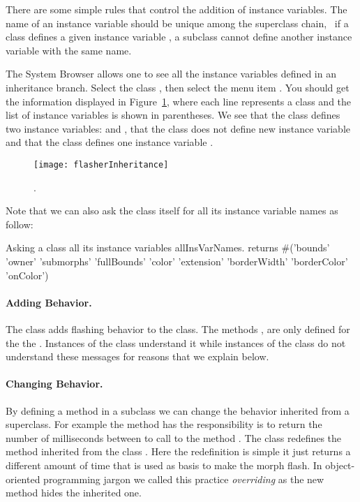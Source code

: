 There are some simple rules that control the addition of instance variables.  The name of an instance variable should be unique among the superclass chain, \ie\ if a class defines a given instance variable , a subclass cannot define another instance variable with the same name. 

The System Browser allows one to see all the instance variables defined in an inheritance branch. Select the class , then select the menu item . You should get the information displayed in Figure~\ref{fig:flasherInheritance}, where each line represents a class and the list of instance variables is shown in parentheses. 
We see that the class  defines two instance variables:  and , that the class  does not define new instance variable and that the class  defines one instance variable .

\begin{figure}[h]
\begin{center}
\texttt{[image: flasherInheritance]}
\caption{.\label{fig:flasherInheritance}}
\end{center}
\end{figure}

Note that we can also ask the class itself for all its instance variable names as follow:

\begin{scriptwithtitle}{Asking a class all its instance variables}
  allInsVarNames.
returns
#('bounds' 'owner' 'submorphs' 'fullBounds' 'color' 'extension' 
'borderWidth' 'borderColor' 'onColor')
\end{scriptwithtitle}


\paragraph{Adding Behavior.} The class  adds flashing behavior to the  class. The methods ,  are only defined for the the . Instances of the class  understand it while instances of the class  do not understand these messages for reasons that we  explain below.

\paragraph{Changing Behavior.} By defining a method in a subclass we can change the behavior inherited from a superclass. For example the method  has the  responsibility is to return the number of milliseconds between to call to the method . The class  redefines the method  inherited from the class . Here the redefinition is simple it just returns a different amount of time that is used as basis to make the morph flash. In object-oriented programming jargon we called this practice \emph{overriding} as the new method hides the inherited one.

